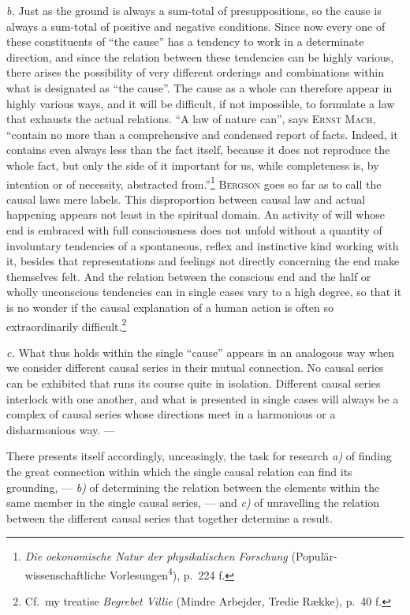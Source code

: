 \documentclass[12pt]{book}
\newcommand{\opage}[1]{\marginnote{\footnotesize\textit{[#1]}}}
\begin{document}
\textit{b.} Just as the ground is always a sum-total of presuppositions, so the
cause is always a sum-total of positive and negative conditions. Since now every one
of these constituents of ``the cause'' has a tendency to work in a determinate
direction, and since the relation between these tendencies can be highly various,
there arises the possibility of very different orderings and combinations within
what is designated as ``the cause''. The cause as a whole can therefore appear in
highly various ways, and it will be difficult, if not impossible, to formulate a law
that exhausts the actual relations. ``A law of nature can'', says \textsc{Ernst
Mach}, ``contain no more than a comprehensive and condensed report of facts. Indeed,
it contains even always less than the fact itself, because it does not reproduce the
whole fact, but only the side of it important for us, while completeness is, by
intention or of necessity, abstracted from.''\footnote{\textit{Die oekonomische Natur
der physikalischen Forschung} (Populär-wissenschaftliche
Vorlesungen\textsuperscript{4}), p.\ 224 f.} \textsc{Bergson} goes so far as to call
the causal laws mere labels. This disproportion between causal law and \opage{50}actual
happening appears not least in the spiritual domain. An activity of will whose end
is embraced with full consciousness does not unfold without a quantity of
involuntary tendencies of a spontaneous, reflex and instinctive kind working with
it, besides that representations and feelings not directly concerning the end make
themselves felt. And the relation between the conscious end and the half or wholly
unconscious tendencies can in single cases vary to a high degree, so that it is no
wonder if the causal explanation of a human action is often so extraordinarily
difficult.\footnote{Cf.\ my treatise \textit{Begrebet Villie} (Mindre Arbejder,
Tredie Række), p.\ 40 f.}

\textit{c.} What thus holds within the single ``cause'' appears in an analogous way
when we consider different causal series in their mutual connection. No causal series
can be exhibited that runs its course quite in isolation. Different causal series
interlock with one another, and what is presented in single cases will always be a
complex of causal series whose directions meet in a harmonious or a disharmonious
way. ---

There presents itself accordingly, unceasingly, the task for research \textit{a)} of
finding the great connection within which the single causal relation can find its
grounding, --- \textit{b)} of determining the relation between the elements within
the same member in the single causal series, --- and \textit{c)} of unravelling the
relation between the different causal series that together determine a result.
\end{document}
